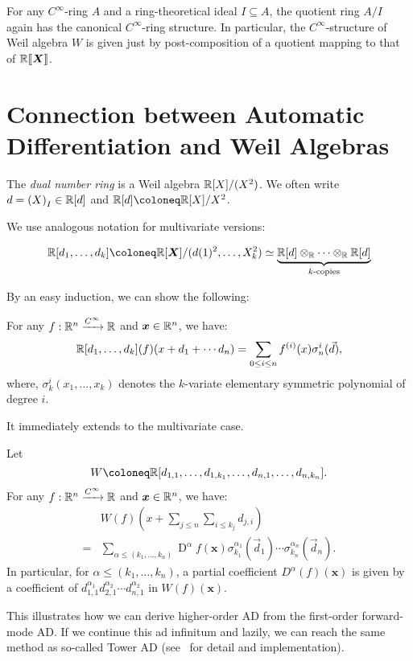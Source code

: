 \documentclass[%
  sigconf,authorversion,screen]{acmart}
\begin{document}
\begin{lemma}\label{lem:quot-ring-ideal}
  For any $C^\infty$-ring $A$ and a ring-theoretical ideal $I \subseteq A$, the quotient ring $A/I$ again has the canonical $C^\infty$-ring structure.
  In particular, the $C^\infty$-structure of Weil algebra $W$ is given just by post-composition of a quotient mapping to that of $\mathord{\mathbb{R}\llbracket\boldsymbol{X}\rrbracket}$.
\end{lemma}

\section{Connection between Automatic Differentiation and Weil Algebras}
\label{sec:ad-and-weils}

\begin{definition}
  The \emph{dual number ring} is a Weil algebra $\mathbb{R}[X]/(X^2)$.
  We often write $d = {(X)}_I \in \mathbb{R}[d]$ and $\R[d] \coloneq \R[X]/X^2$.

  We use analogous notation for multivariate versions:
  
  \[
    \R[d_1, \dots, d_k] \coloneq \R[\X]/(d(1)^2, \dots, X_k^2)
    \simeq \underbrace{\R[d] \otimes_\R \dots \otimes_\R \R[d]}_{k\text{-copies}}
  \]
\end{definition}

By an easy induction, we can show the following:
\begin{theorem}\label{thm:univ-partial-duals}
  For any $f: \mathbb{R}^n \xrightarrow{C^\infty} \mathbb{R}$ and $\boldsymbol{x} \in \mathbb{R}^n$, we have:
  \[
    \mathbb{R}[d_1, \dots, d_k](f)(x + d_1 + \cdots d_n) 
    = \sum_{0 \leq i \leq n} f^{(i)}(x)\sigma^i_n(\vec{d}),
  \]
  where, $\sigma^i_k(x_1, \dots, x_k)$ denotes the $k$-variate elementary symmetric polynomial of degree $i$.
\end{theorem}

It immediately extends to the multivariate case.

\begin{theorem}\label{thm:multi-partial-duals}
  Let
  \[
    W \coloneq \R[d_{1,1}, \dots, d_{1,k_1}, \dots, d_{n,1}, \dots, d_{n,k_n}].
  \]
  For any $f: \mathbb{R}^n \xrightarrow{C^\infty} \mathbb{R}$ and $\boldsymbol{x} \in \mathbb{R}^n$, we have:
  \begin{align*}
    &W(f)\left(x + \sum_{j \leq n}\sum_{i \leq k_j} d_{j,i}\right) \\
    = &\sum_{\alpha \leq (k_1,\dots,k_n)} \mathop{D}\nolimits^\alpha f(\boldsymbol{x})
    \sigma^{\alpha_1}_{k_1}(\vec{d}_1) 
    \cdots
    \sigma^{\alpha_n}_{k_n}(\vec{d}_n).
  \end{align*}
  In particular, for $\alpha \leq (k_1, \dots, k_n)$, a partial coefficient $D^\alpha(f)(\boldsymbol{x})$ is given by a coefficient of $d_{1,1}^{\alpha_1} d_{2,1}^{\alpha_2} \cdots d_{n,1}^{\alpha_2}$ in $W(f)(\boldsymbol{x})$.
\end{theorem}
This illustrates how we can derive higher-order AD from the first-order forward-mode AD.
If we continue this ad infinitum and lazily, we can reach the same method as so-called Tower AD (see~\cite{Pearlmutter:2007aa,Kmett:2010aa} for detail and implementation).
\end{document}
